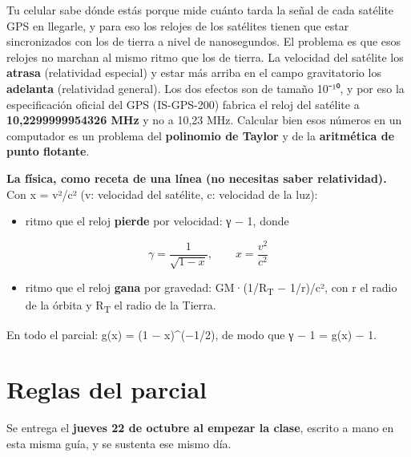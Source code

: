 
\newcommand{\docpie}{Parcial 1 · Taylor · GPS}

Tu celular sabe dónde estás porque mide cuánto tarda la señal de cada satélite GPS en llegarle, y para eso los relojes de los satélites tienen que estar sincronizados con los de tierra a nivel de nanosegundos. El problema es que esos relojes no marchan al mismo ritmo que los de tierra. La velocidad del satélite los \textbf{atrasa} (relatividad especial) y estar más arriba en el campo gravitatorio los \textbf{adelanta} (relatividad general). Los dos efectos son de tamaño 10⁻¹⁰, y por eso la especificación oficial del GPS (IS-GPS-200) fabrica el reloj del satélite a \textbf{10,2299999954326 MHz} y no a 10,23 MHz. Calcular bien esos números en un computador es un problema del \textbf{polinomio de Taylor} y de la \textbf{aritmética de punto flotante}.

\textbf{La física, como receta de una línea (no necesitas saber relatividad).} Con x = v²/c² (v: velocidad del satélite, c: velocidad de la luz):

\begin{itemize}
\tightlist
\item
  ritmo que el reloj \textbf{pierde} por velocidad: γ − 1, donde
\end{itemize}

\[\gamma = \frac{1}{\sqrt{1-x}}, \qquad x = \frac{v^2}{c^2}\]

\begin{itemize}
\tightlist
\item
  ritmo que el reloj \textbf{gana} por gravedad: GM·(1/R\textsubscript{T} − 1/r)/c², con r el radio de la órbita y R\textsubscript{T} el radio de la Tierra.
\end{itemize}

En todo el parcial: g(x) = (1 − x)\^{}(−1/2), de modo que γ − 1 = g(x) − 1.

\section{Reglas del parcial}

Se entrega el \textbf{jueves 22 de octubre al empezar la clase}, escrito a mano en esta misma guía, y se sustenta ese mismo día.

